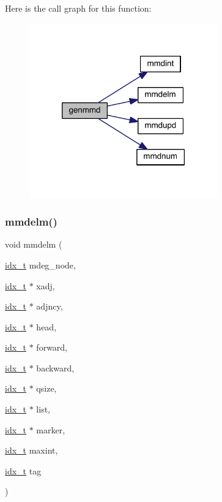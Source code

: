 Here is the call graph for this function\+:\nopagebreak
\begin{figure}[H]
\begin{center}
\leavevmode
\includegraphics[width=230pt]{a00248_a1e95a23d02012fa27796f130010599dc_cgraph}
\end{center}
\end{figure}
\mbox{\label{a00248_a6425fb0927ca94b9d4064e04071a44be}} 
\subsubsection{\texorpdfstring{mmdelm()}{mmdelm()}}
{\footnotesize\ttfamily void mmdelm (\begin{DoxyParamCaption}\item[{\hyperlink{a00876_aaa5262be3e700770163401acb0150f52}{idx\+\_\+t}}]{mdeg\+\_\+node,  }\item[{\hyperlink{a00876_aaa5262be3e700770163401acb0150f52}{idx\+\_\+t} $\ast$}]{xadj,  }\item[{\hyperlink{a00876_aaa5262be3e700770163401acb0150f52}{idx\+\_\+t} $\ast$}]{adjncy,  }\item[{\hyperlink{a00876_aaa5262be3e700770163401acb0150f52}{idx\+\_\+t} $\ast$}]{head,  }\item[{\hyperlink{a00876_aaa5262be3e700770163401acb0150f52}{idx\+\_\+t} $\ast$}]{forward,  }\item[{\hyperlink{a00876_aaa5262be3e700770163401acb0150f52}{idx\+\_\+t} $\ast$}]{backward,  }\item[{\hyperlink{a00876_aaa5262be3e700770163401acb0150f52}{idx\+\_\+t} $\ast$}]{qsize,  }\item[{\hyperlink{a00876_aaa5262be3e700770163401acb0150f52}{idx\+\_\+t} $\ast$}]{list,  }\item[{\hyperlink{a00876_aaa5262be3e700770163401acb0150f52}{idx\+\_\+t} $\ast$}]{marker,  }\item[{\hyperlink{a00876_aaa5262be3e700770163401acb0150f52}{idx\+\_\+t}}]{maxint,  }\item[{\hyperlink{a00876_aaa5262be3e700770163401acb0150f52}{idx\+\_\+t}}]{tag }\end{DoxyParamCaption})}

